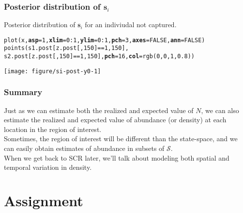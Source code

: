 \documentclass[color=usenames,dvipsnames]{beamer}\usepackage[]{graphicx}\usepackage[]{color}
\makeatletter
\newcommand{\hlnum}[1]{\textcolor[rgb]{0.69,0.494,0}{#1}}%
\newcommand{\hlopt}[1]{\textcolor[rgb]{0,0,0}{#1}}%
\newcommand{\hlstd}[1]{\textcolor[rgb]{0,0,0}{#1}}%
\newcommand{\hlkwc}[1]{\textcolor[rgb]{0,0,0}{\textbf{#1}}}%
\newcommand{\hlkwd}[1]{\textcolor[rgb]{0.004,0.004,0.506}{#1}}%
\newenvironment{kframe}{%
 \def\at@end@of@kframe{}%
 \ifinner\ifhmode%
  \def\at@end@of@kframe{\end{minipage}}%
  \begin{minipage}{\columnwidth}%
 \fi\fi%
 \def\FrameCommand##1{\hskip\@totalleftmargin \hskip-\fboxsep
 \colorbox{shadecolor}{##1}\hskip-\fboxsep
     \hskip-\linewidth \hskip-\@totalleftmargin \hskip\columnwidth}%
 \MakeFramed {\advance\hsize-\width
   \@totalleftmargin\z@ \linewidth\hsize
   \@setminipage}}%
 {\par\unskip\endMakeFramed%
 \at@end@of@kframe}
\newenvironment{knitrout}{}{} %
\newcommand{\bsi}{{\bm s}_i}
\makeatother
\begin{document}
\begin{frame}[fragile]
  \frametitle{Posterior distribution of $\bsi$}
  \small
  Posterior distribution of $\bsi$ for an indiviudal \alert{not}
  captured. 
\begin{knitrout}\scriptsize
{}\color{fgcolor}\begin{kframe}
\begin{alltt}
\hlkwd{plot}\hlstd{(x,} \hlkwc{asp}\hlstd{=}\hlnum{1}\hlstd{,} \hlkwc{xlim}\hlstd{=}\hlnum{0}\hlopt{:}\hlnum{1}\hlstd{,} \hlkwc{ylim}\hlstd{=}\hlnum{0}\hlopt{:}\hlnum{1}\hlstd{,} \hlkwc{pch}\hlstd{=}\hlnum{3}\hlstd{,} \hlkwc{axes}\hlstd{=}\hlnum{FALSE}\hlstd{,} \hlkwc{ann}\hlstd{=}\hlnum{FALSE}\hlstd{)}
\hlkwd{points}\hlstd{(s1.post[z.post[,}\hlnum{150}\hlstd{]}\hlopt{==}\hlnum{1}\hlstd{,}\hlnum{150}\hlstd{],}
       \hlstd{s2.post[z.post[,}\hlnum{150}\hlstd{]}\hlopt{==}\hlnum{1}\hlstd{,}\hlnum{150}\hlstd{],} \hlkwc{pch}\hlstd{=}\hlnum{16}\hlstd{,} \hlkwc{col}\hlstd{=}\hlkwd{rgb}\hlstd{(}\hlnum{0}\hlstd{,}\hlnum{0}\hlstd{,}\hlnum{1}\hlstd{,}\hlnum{0.8}\hlstd{))}
\end{alltt}
\end{kframe}
\end{knitrout}
\centering
\texttt{[image: figure/si-post-y0-1]} \\
\end{frame}





\begin{frame}
  \frametitle{Summary}
  Just as we can estimate both the realized and expected value of $N$,
  we can also estimate the realized and expected value of abundance
  (or density) at each location in the region of interest. \\
  \pause \vfill
  Sometimes, the region of interest will be different than the
  state-space, and we can easily obtain estimates of abundance in
  subsets of $\mathcal{S}$. \\
  \pause \vfill
  When we get back to SCR later, we'll talk about modeling both
  spatial and temporal variation in density.
\end{frame}




\section{Assignment}
\end{document}
